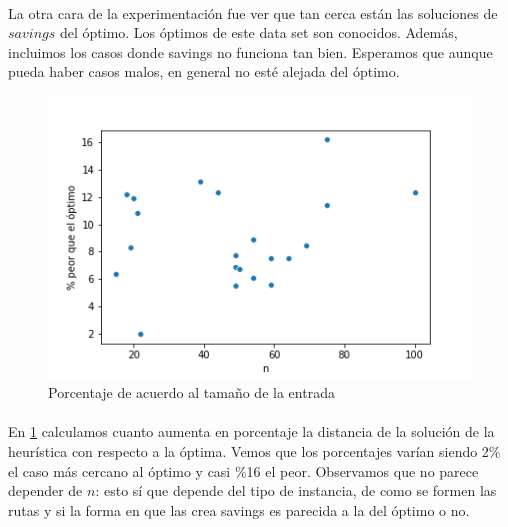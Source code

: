 \paragraph{}
La otra cara de la experimentación fue ver que tan cerca están las soluciones de $savings$ del óptimo. Los óptimos de este data set son conocidos. Además, incluimos los casos donde savings no funciona tan bien. Esperamos que aunque pueda haber casos malos, en general no esté alejada del óptimo. 

\begin{figure}[H]
	\centering
	\begin{minipage}{0.50\textwidth}
	\includegraphics[width=1\textwidth]{images/savings/Pporcentaje}
	\caption{\footnotesize Porcentaje de acuerdo al tamaño de la entrada}
	\label{fig:savings-Pporcentaje}
	\end{minipage}
\end{figure}
\paragraph{} 
En \ref{fig:savings-Pporcentaje} calculamos cuanto aumenta en porcentaje la distancia de la solución de la heurística con respecto a la óptima. Vemos que los porcentajes varían siendo 2\% el caso más cercano al óptimo y casi \%16 el peor. Observamos que no parece depender de $n$: esto sí que depende del tipo de instancia, de como se formen las rutas y si la forma en que las crea savings es parecida a la del óptimo o no.
